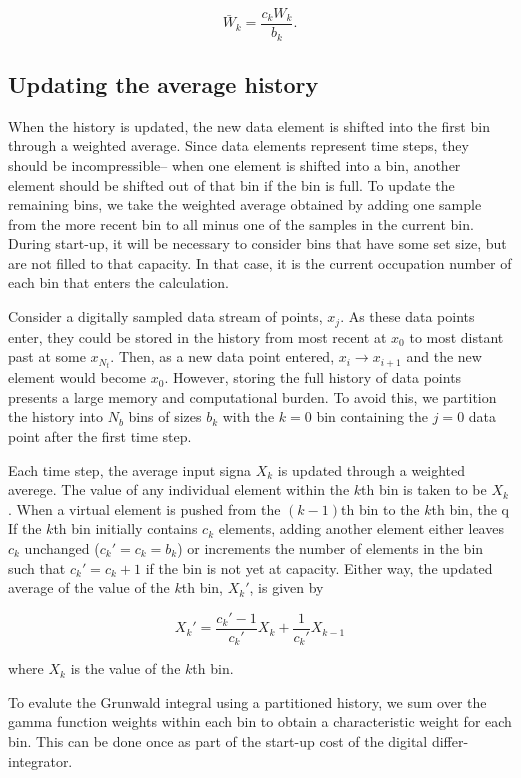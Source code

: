 \begin{equation}
\bar{W}_k= \frac{c_k W_k}{b_k}.
\label{Wbar}
\end{equation} 

\subsection{Updating the average history}

When the history is updated, the new data element is shifted into the first bin through a weighted average. Since data elements represent time steps, they should be incompressible-- when one element is shifted into a bin, another element should be shifted out of that bin if the bin is full. To update the remaining bins, we take the weighted average obtained by adding one sample from the more recent bin to all minus one of the samples in the current bin. During start-up, it will be necessary to consider bins that have some set size, but are not filled to that capacity. In that case, it is the current occupation number of each bin that enters the calculation. 

Consider a digitally sampled data stream of points, $x_j$. As these data points enter, they could be stored in the history from most recent at $x_0$ to most distant past at some $x_{N_t}$.  Then, as a new data point entered, $x_i\rightarrow x_{i+1}$ and the new element would become $x_0$. However, storing the full history of data points presents a large memory and computational burden. To avoid this, we partition the history into $N_b$ bins of sizes $b_k$ with the $k=0$ bin containing the $j=0$ data point after the first time step. 


Each time step, the average input signa $X_k$ is updated through a weighted averege. The value of any individual element within the $k$th bin is taken to be $X_k$. When a virtual element is pushed from the $(k-1)$th bin to the $k$th bin, the q If the $k$th bin initially contains $c_k$
elements, adding another element either leaves $c_k$ unchanged
($c_k\prime=c_k=b_k$) or increments the number of elements in the bin such
that $c_k\prime = c_k + 1$ if the bin is not yet at capacity. Either way, the updated average of the
value of the $k$th bin, $X_k\prime$, is given by

\begin{equation}
X_k\prime = \frac{c_k\prime-1}{c_k\prime}X_k + \frac{1}{c_k\prime}X_{k-1}
\label{avgShiftReg}
\end{equation}

\noindent where $X_k$ is the value of the $k$th bin.

To evalute the Grunwald integral using a partitioned history, we sum over the gamma function weights within each bin to obtain a characteristic weight for each bin. This can be done once as part of the start-up cost of the digital differ-integrator. 







